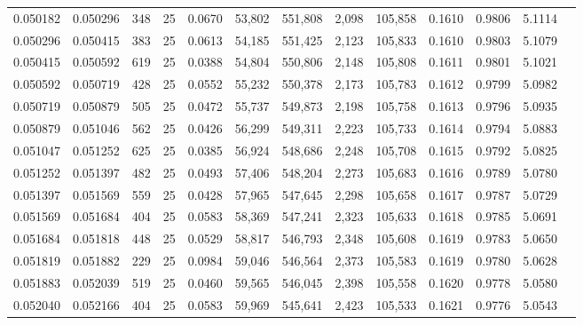 \begin{tabular}{rrrrrrrrrrrrr}
0.050182 & 0.050296 &   348 &  25 &                                     0.0670 &  53,802 & 551,808 &   2,098 & 105,858 & 0.1610 & 0.9806 & 5.1114 \\
0.050296 & 0.050415 &   383 &  25 &                                     0.0613 &  54,185 & 551,425 &   2,123 & 105,833 & 0.1610 & 0.9803 & 5.1079 \\
0.050415 & 0.050592 &   619 &  25 &                                     0.0388 &  54,804 & 550,806 &   2,148 & 105,808 & 0.1611 & 0.9801 & 5.1021 \\
0.050592 & 0.050719 &   428 &  25 &                                     0.0552 &  55,232 & 550,378 &   2,173 & 105,783 & 0.1612 & 0.9799 & 5.0982 \\
0.050719 & 0.050879 &   505 &  25 &                                     0.0472 &  55,737 & 549,873 &   2,198 & 105,758 & 0.1613 & 0.9796 & 5.0935 \\
0.050879 & 0.051046 &   562 &  25 &                                     0.0426 &  56,299 & 549,311 &   2,223 & 105,733 & 0.1614 & 0.9794 & 5.0883 \\
0.051047 & 0.051252 &   625 &  25 &                                     0.0385 &  56,924 & 548,686 &   2,248 & 105,708 & 0.1615 & 0.9792 & 5.0825 \\
0.051252 & 0.051397 &   482 &  25 &                                     0.0493 &  57,406 & 548,204 &   2,273 & 105,683 & 0.1616 & 0.9789 & 5.0780 \\
0.051397 & 0.051569 &   559 &  25 &                                     0.0428 &  57,965 & 547,645 &   2,298 & 105,658 & 0.1617 & 0.9787 & 5.0729 \\
0.051569 & 0.051684 &   404 &  25 &                                     0.0583 &  58,369 & 547,241 &   2,323 & 105,633 & 0.1618 & 0.9785 & 5.0691 \\
0.051684 & 0.051818 &   448 &  25 &                                     0.0529 &  58,817 & 546,793 &   2,348 & 105,608 & 0.1619 & 0.9783 & 5.0650 \\
0.051819 & 0.051882 &   229 &  25 &                                     0.0984 &  59,046 & 546,564 &   2,373 & 105,583 & 0.1619 & 0.9780 & 5.0628 \\
0.051883 & 0.052039 &   519 &  25 &                                     0.0460 &  59,565 & 546,045 &   2,398 & 105,558 & 0.1620 & 0.9778 & 5.0580 \\
0.052040 & 0.052166 &   404 &  25 &                                     0.0583 &  59,969 & 545,641 &   2,423 & 105,533 & 0.1621 & 0.9776 & 5.0543 \\

\end{tabular}
